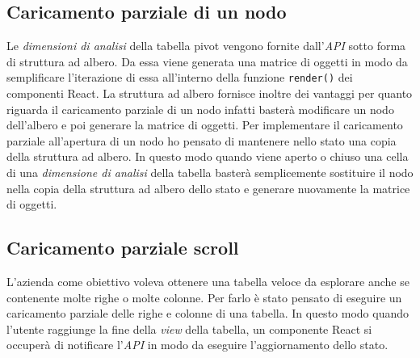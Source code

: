 \subsection*{Caricamento parziale di un nodo}
Le \emph{dimensioni di analisi} della tabella pivot vengono fornite dall'\emph{API} sotto forma di struttura ad albero. Da essa viene generata una matrice di oggetti in modo da semplificare l'iterazione di essa all'interno della funzione \verb|render()| dei componenti React. La struttura ad albero fornisce inoltre dei vantaggi per quanto riguarda il caricamento parziale di un nodo infatti basterà modificare un nodo dell'albero e poi generare la matrice di oggetti. Per implementare il caricamento parziale all'apertura di un nodo ho pensato di mantenere nello stato una copia della struttura ad albero. In questo modo quando viene aperto o chiuso una cella di una \emph{dimensione di analisi}  della tabella basterà semplicemente sostituire il nodo nella copia della struttura ad albero dello stato e generare nuovamente la matrice di oggetti.

\subsection*{Caricamento parziale scroll}
L'azienda come obiettivo voleva ottenere una tabella veloce da esplorare anche se contenente molte righe o molte colonne. Per farlo è stato pensato di eseguire un caricamento parziale delle righe e colonne di una tabella. In questo modo quando l'utente raggiunge la fine della \emph{view} della tabella, un componente React si occuperà di notificare l'\emph{API} in modo da eseguire l'aggiornamento dello stato.

